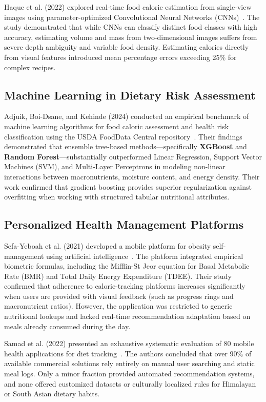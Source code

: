 \documentclass[12pt,a4paper]{report}
\begin{document}
Haque et al. (2022) explored real-time food calorie estimation from single-view images using parameter-optimized Convolutional Neural Networks (CNNs)~\cite{haque2022}. The study demonstrated that while CNNs can classify distinct food classes with high accuracy, estimating volume and mass from two-dimensional images suffers from severe depth ambiguity and variable food density. Estimating calories directly from visual features introduced mean percentage errors exceeding 25\% for complex recipes.

\subsection{Machine Learning in Dietary Risk Assessment}
Adjuik, Boi-Dsane, and Kehinde (2024) conducted an empirical benchmark of machine learning algorithms for food caloric assessment and health risk classification using the USDA FoodData Central repository~\cite{adjuik2024}. Their findings demonstrated that ensemble tree-based methods---specifically \textbf{XGBoost} and \textbf{Random Forest}---substantially outperformed Linear Regression, Support Vector Machines (SVM), and Multi-Layer Perceptrons in modeling non-linear interactions between macronutrients, moisture content, and energy density. Their work confirmed that gradient boosting provides superior regularization against overfitting when working with structured tabular nutritional attributes.

\subsection{Personalized Health Management Platforms}
Sefa-Yeboah et al. (2021) developed a mobile platform for obesity self-management using artificial intelligence~\cite{sefayeboah2021}. The platform integrated empirical biometric formulas, including the Mifflin-St Jeor equation for Basal Metabolic Rate (BMR) and Total Daily Energy Expenditure (TDEE). Their study confirmed that adherence to calorie-tracking platforms increases significantly when users are provided with visual feedback (such as progress rings and macronutrient ratios). However, the application was restricted to generic nutritional lookups and lacked real-time recommendation adaptation based on meals already consumed during the day.

Samad et al. (2022) presented an exhaustive systematic evaluation of 80 mobile health applications for diet tracking~\cite{samad2022}. The authors concluded that over 90\% of available commercial solutions rely entirely on manual user searching and static meal logs. Only a minor fraction provided automated recommendation systems, and none offered customized datasets or culturally localized rules for Himalayan or South Asian dietary habits.
\end{document}
